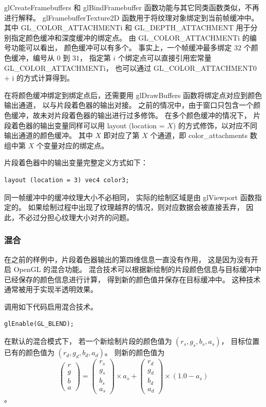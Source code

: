 \documentclass[fontset=windows]{ctexart}
\begin{document}
glCreateFramebuffers 和 glBindFramebuffer 函数功能与其它同类函数类似，不再进行解释。
glFramebufferTexture2D 函数用于将纹理对象绑定到当前帧缓冲中。
其中 GL\_COLOR\_ATTACHMENTi 和 GL\_DEPTH\_ATTACHMENT 用于分别指定颜色缓冲和深度缓冲的绑定点。
由 GL\_COLOR\_ATTACHMENTi 的编号功能可以看出，
颜色缓冲可以有多个。
事实上，一个帧缓冲最多绑定 $32$ 个颜色缓冲，编号从 $0$ 到 $31$，
指定第 $i$ 个绑定点可以直接引用宏常量 GL\_COLOR\_ATTACHMENTi，
也可以通过 GL\_COLOR\_ATTACHMENT0 + i 的方式计算得到。

在将颜色缓冲绑定到绑定点后，还需要用 glDrawBuffers 函数将绑定点对应到颜色输出通道，
以与片段着色器的输出对接。
之前的情况中，由于窗口只包含一个颜色缓冲，故未对片段着色器的输出进行过多修饰。
在多个颜色缓冲的情况下，
片段着色器的输出变量同样可以用 layout (location = $X$) 的方式修饰，以对应不同输出通道的颜色缓冲。
其中 $X$ 即对应了第 $X$ 个通道，即 color\_attachments 数组中第 $X$ 个变量对应的绑定点。

片段着色器中的输出变量完整定义方式如下：
\begin{lstlisting}
layout (location = 3) vec4 color3;
\end{lstlisting}

同一帧缓冲中的缓冲纹理大小不必相同，
实际的绘制区域是由 glViewport 函数指定的。
如果绘制过程中出现了纹理越界的情况，则对应数据会被直接丢弃，
因此，不必过分担心纹理大小对齐的问题。

\subsubsection{混合}

在之前的样例中，片段着色器输出的第四维信息一直没有作用，
这是因为没有开启 OpenGL 的混合功能。
混合技术可以根据新绘制的片段颜色信息与目标缓冲中已经保存的颜色信息进行计算，
得到新的颜色值并保存在目标缓冲中。
这种技术通常被用于实现半透明效果。

调用如下代码启用混合技术。

\begin{lstlisting}
glEnable(GL_BLEND);
\end{lstlisting}

在默认的混合模式下，
若一个新绘制片段的颜色值为 $\left(r_s, g_s, b_s, a_s\right)$，
目标位置已有的颜色值为 $\left(r_d, g_d, b_d, a_d\right)$。
则新的颜色值为 $$\left(\begin{matrix}
    r\\g\\b\\a
\end{matrix}\right)=\left(\begin{matrix}
    r_s\\g_s\\b_s\\a_s
\end{matrix}\right)\times a_s+\left(\begin{matrix}
    r_d\\g_d\\b_d\\a_d
\end{matrix}\right)\times(1.0-a_s)$$。
\end{document}
